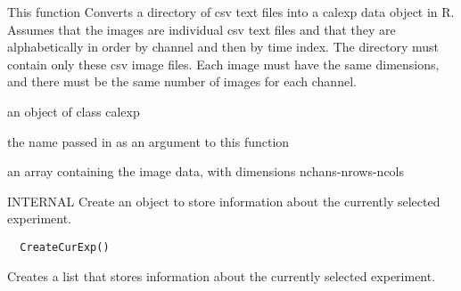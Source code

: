 \documentclass[a4paper]{book}
\begin{document}
%
\begin{Details}\relax
This function Converts a directory of csv text files into
a calexp data object in R. Assumes that the images are
individual csv text files and that they are
alphabetically in order by channel and then by time
index.  The directory must contain only these csv image
files. Each image must have the same dimensions, and
there must be the same number of images for each channel.
\end{Details}
%
\begin{Value}
an object of class calexp \begin{ldescription}
\item[\code{name}] the name passed in
as an argument to this function\item[\code{data}] an array
containing the image data, with dimensions
nchans-nrows-ncols
\end{ldescription}
\end{Value}
%
\begin{Description}\relax
INTERNAL Create an object to store information about the
currently selected experiment.
\end{Description}
%
\begin{Usage}
\begin{verbatim}
  CreateCurExp()
\end{verbatim}
\end{Usage}
%
\begin{Details}\relax
Creates a list that stores information about the
currently selected experiment.
\end{Details}
%
\end{document}
